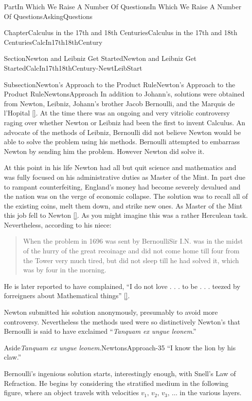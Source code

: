 \documentclass[oneside,10pt,]{book}
\newcommand{\xreffont}{\relax}
\numberwithin{equation}{part}
\begin{document}
\begin{partptx}{Part}{In Which We Raise A Number Of Questions}{}{In Which We Raise A Number Of Questions}{}{}{AskingQuestions}
\begin{chapterptx}{Chapter}{Calculus in the 17th and 18th Centuries}{}{Calculus in the 17th and 18th Centuries}{}{}{CalcIn17th18thCentury}
\begin{sectionptx}{Section}{Newton and Leibniz Get Started}{}{Newton and Leibniz Get Started}{}{}{CalcIn17th18thCentury-NewtLeibStart}
\begin{subsectionptx}{Subsection}{Newton's Approach to the Product Rule}{}{Newton's Approach to the Product Rule}{}{}{NewtonsApproach}
In addition to Johann's, solutions were obtained from Newton,  Leibniz, Johann's brother Jacob Bernoulli,  and the Marquis de l'Hopital \hyperlink{struik69__sourc_book_mathem}{[{\xreffont 15}]}.  At the time there was an ongoing and very vitriolic controversy raging over whether Newton or Leibniz had been the first to invent Calculus.  An advocate of the methods of Leibniz, Bernoulli did not believe Newton would be able to solve the problem using his methods. Bernoulli attempted to embarrass Newton by sending him the problem.  However Newton did solve it.%
\par
At this point in his life Newton had all but quit science and mathematics and was fully focused on his administrative duties as Master of the Mint.  In part due to rampant counterfeiting, England's money had become severely devalued and the nation was on the verge of economic collapse.  The solution was to recall all of the existing coins, melt them down, and strike new ones.  As Master of the Mint this job fell to Newton \hyperlink{levenson09__newton_count}{[{\xreffont 8}]}.  As you might imagine this was a rather Herculean task.  Nevertheless, according to his niece:%
\begin{quote}%
When the problem in 1696 was sent by Bernoulli\textendash{}Sir I.N. was in the midst of the hurry of the great recoinage and did not come home till four from the Tower very much tired, but did not sleep till he had solved it, which was by four in the morning.%
\end{quote}
He is later reported to have complained, ``I do not love . . . to be . . . teezed by forreigners about Mathematical things'' \hyperlink{dunham90__journ_throug_genius}{[{\xreffont 2}]}.%
\par
{} Newton submitted his solution anonymously, presumably to avoid more controversy.  Nevertheless the methods used were so distinctively Newton's that Bernoulli is said to have exclaimed ``\textit{Tanquam ex ungue leonem}.''%
\begin{aside}{Aside}{\textit{Tanquam ex ungue leonem}.}{NewtonsApproach-35}%
``I know the lion by his claw.''%
\end{aside}
 Bernoulli's ingenious solution starts, interestingly enough, with Snell's Law of Refraction. He begins by considering the stratified medium in the following figure, where an object travels with velocities \(v_1,\,v_2,\,v_3,\,\ldots\) in the various layers.%

\end{subsectionptx}
\end{sectionptx}
\end{chapterptx}
\end{partptx}
\end{document}
